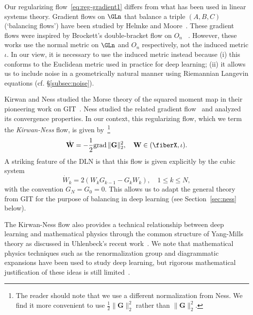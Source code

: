\begin{remark}
\label{rem:reg-flow}
Our regularizing flow~\eqref{eq:reg-gradient1} differs from what has been used in linear systems theory. Gradient flows on $\GLn$ that balance a triple $(A,B,C)$ (`balancing flows') have been studied by Helmke and Moore~\cite{Helmke-Moore}. These gradient flows were inspired by Brockett's double-bracket flow on $O_n$~
\cite{Brockett}. However, these works use the normal metric on $\GLn$ and $O_n$ respectively, not the induced metric $\iota$. In our view, it is necessary to use the induced metric instead because (i) this conforms to the Euclidean metric used in practice for deep learning; (ii) it allows us to include noise in a geometrically natural manner using Riemannian Langevin equations (cf. \S \ref{subsec:noise}). %
\end{remark}
\begin{remark}
\label{rem:ness-flow}
Kirwan and Ness studied the Morse theory of the squared moment map in their pioneering work on GIT~\cite{Kirwan,Ness}. Ness studied the related gradient flow~\cite[\S 3-7]{Ness} and analyzed its convergence properties. In our context, this regularizing flow, which we term the {\em Kirwan-Ness\/} flow, is given by~\footnote{The reader should note that we use a different normalization from Ness. We find it more convenient to use $\tfrac{1}{2}\|\mathbf{G}\|_2^2$ rather than $\|\mathbf{G}\|_2^2$.}
\begin{equation}
\label{eq:reg-gradient5}
    \dot{\mathbf{W}}= -\frac{1}{2}\mathrm{grad}\,\|\mathbf{G}\|_2^2, \quad \mathbf{W}\in (\fiberX,\iota).
\end{equation}
A striking feature of the DLN is that this flow is given explicitly by the cubic system
\begin{equation}
    \label{eq:ness-flow-coords}
    \dot{W}_k = 2(W_kG_{k-1}-G_{k}W_k), \quad 1\leq k \leq N,
\end{equation}
with the convention $G_N=G_0=0$. This allows us to adapt the general theory from GIT for the purpose of balancing in deep learning (see Section~\ref{sec:ness} below). 

The Kirwan-Ness flow also provides a technical relationship between deep learning and mathematical physics through the common structure of Yang-Mills theory as discussed in Uhlenbeck's recent work~\cite{Atiyah-Bott-YM,Uhlenbeck2026}. We note that mathematical physics techniques such as the renormalization group and diagrammatic expansions have been used to study deep learning, but rigorous mathematical justification of these ideas is still limited~\cite{Hanin-book}. 
\end{remark}

